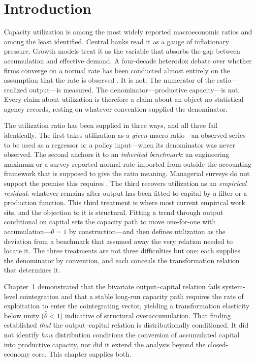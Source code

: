 \section{Introduction}
\label{sec:intro}

Capacity utilization is among the most widely reported macroeconomic
ratios and among the least identified. Central banks read it as a gauge
of inflationary pressure. Growth models treat it as the variable that
absorbs the gap between accumulation and effective demand. A four-decade
heterodox debate over whether firms converge on a normal rate has been
conducted almost entirely on the assumption that the rate is observed
\citep{Kurz1986, BleckerSetterfield2019}. It is not. The numerator of
the ratio---realized output---is measured. The denominator---productive
capacity---is not. Every claim about utilization is therefore a claim
about an object no statistical agency records, resting on whatever
convention supplied the denominator.

The utilization ratio has been supplied in three ways, and all three
fail identically. The first takes utilization as a \emph{given} macro
ratio---an observed series to be used as a regressor or a policy
input---when its denominator was never observed. The second anchors it
to an \emph{inherited benchmark}: an engineering maximum or a
survey-reported normal rate imported from outside the accounting
framework that is supposed to give the ratio meaning. Managerial
surveys do not support the premise this requires
\citep{Singh2022, Nikiforos2016}. The third recovers utilization as an
\emph{empirical residual}: whatever remains after output has been
fitted to capital by a filter or a production function. This third
treatment is where most current empirical work sits, and the objection
to it is structural. Fitting a trend through output conditional on
capital sets the capacity path to move one-for-one with
accumulation---$\theta = 1$ by construction---and then defines
utilization as the deviation from a benchmark that assumed away the
very relation needed to locate it. The three treatments are not three
difficulties but one: each supplies the denominator by convention, and
each conceals the transformation relation that determines it.

Chapter~1 demonstrated that the bivariate output--capital relation
fails system-level cointegration and that a stable long-run capacity
path requires the rate of exploitation to enter the cointegrating
vector, yielding a transformation elasticity below unity
($\hat{\theta} < 1$) indicative of structural overaccumulation. That
finding established \emph{that} the output--capital relation is
distributionally conditioned. It did not identify \emph{how}
distribution conditions the conversion of accumulated capital into
productive capacity, nor did it extend the analysis beyond the
closed-economy core. This chapter supplies both.

